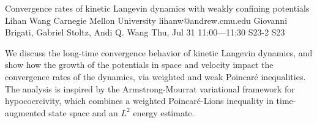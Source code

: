 \begin{talk}
  {Convergence rates of kinetic Langevin dynamics with weakly confining potentials}%
  {Lihan Wang}%
  {Carnegie Mellon University}%
  {lihanw@andrew.cmu.edu}%
  {Giovanni Brigati, Gabriel Stoltz, Andi Q. Wang}%
  {}%
  {Thu, Jul 31 11:00---11:30}%
  {S23-2}%
  {S23}%
  
    
   
We discuss the long-time convergence behavior of kinetic Langevin dynamics, and show how the growth of the potentials in space and velocity impact the convergence rates of the dynamics, via weighted and weak Poincar\'e inequalities. The analysis is inspired by the Armstrong-Mourrat variational framework for hypocoercivity, which combines a weighted Poincar\'e-Lions inequality in time-augmented state space and an $L^2$ energy estimate.


\end{talk}

